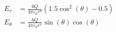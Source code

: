 \documentclass{article}
\begin{document}
 
\addtocounter{equation}{0}
\begin{align}
    E_r &= \frac{6 Q}{4\pi\varepsilon_0 r^{4}} \left(1.5 \cos^{2}{\left (\theta \right )} - 0.5\right) \\
    E_\theta &= \frac{6 Q}{4\pi\varepsilon_0 r^{4}} \sin{\left (\theta \right )} \cos{\left (\theta \right )}
\end{align}
\end{document}
